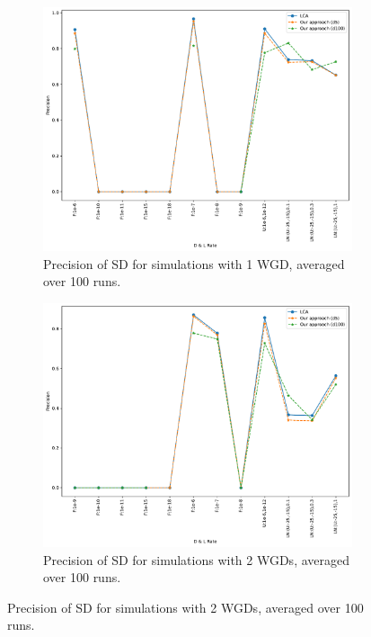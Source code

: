 \documentclass[10pt]{article}
\begin{document}
\begin{figure}[h!]
    \begin{subfigure}[b]{0.48\textwidth}
        \centering
        \includegraphics[width=\textwidth]{figs/precision-sd-t20-t80-Avg.pdf}
        \caption{Precision of SD for simulations with 1 WGD, averaged over 100 runs.}
        \label{fig:precision-sd-1wgd}
    \end{subfigure}
    \hfill
    \begin{subfigure}[b]{0.48\textwidth}
        \centering
        \includegraphics[width=\textwidth]{figs/precision-2W-sd-t20-t80-Avg.pdf}
        \caption{Precision of SD for simulations with 2 WGDs, averaged over 100 runs.}
        \label{fig:precision-sd-2wgd}
    \end{subfigure}
    

\end{figure}
\end{document}

